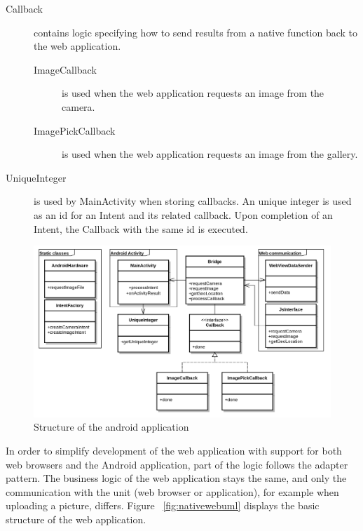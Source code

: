 \begin{description}
	\item[Callback] contains logic specifying how to send results from a native function back to the web application.
	
	\begin{description}
		\item[ImageCallback] is used when the web application requests an image from the camera.
		
		\item[ImagePickCallback] is used when the web application requests an image from the gallery.
		
	\end{description}
	\item[UniqueInteger] is used by MainActivity when storing callbacks. An unique integer is used as an id for an Intent and its related callback. Upon completion of an Intent, the Callback with the same id is executed.
	
\end{description}

\begin{figure}[h!]
	\centering
    \includegraphics[width=120mm,natwidth=800,natheight=600]{./img/polluxuml.png}
    \caption{Structure of the android application}
    \label{fig:nativeuml}
\end{figure}

In order to simplify development of the web application with support for both web browsers and the Android application, part of the logic follows the adapter pattern. The business logic of the web application stays the same, and only the communication with the unit (web browser or application), for example when uploading a picture, differs. Figure ~\ref{fig:nativewebuml} displays the basic structure of the web application. 


